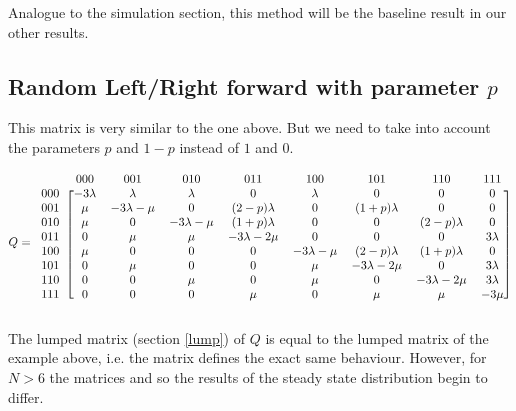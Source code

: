 \documentclass[10pt,a4paper]{article}
\begin{document}
Analogue to the simulation section, this method will be the baseline result in our other results.

\subsection{Random Left/Right forward with parameter $p$}
This matrix is very similar to the one above. But we need to take into account the parameters $p$ and $1-p$ instead of $1$ and $0$.

\[ Q =
  \begin{blockarray}{ccccccccc}
    & 000 & 001 & 010 & 011 & 100 & 101 & 110 & 111 \\
    \begin{block}{c[cccccccc]}
    000 & -3 \lambda & \lambda & \lambda & 0 & \lambda & 0 & 0 & 0 \\
    001 & \mu & -3\lambda-\mu & 0 & (2-p)\lambda & 0 & (1+p)\lambda & 0 & 0 \\
    010 & \mu & 0 & -3\lambda-\mu & (1+p)\lambda & 0 & 0 & (2-p)\lambda & 0 \\
    011 & 0 & \mu & \mu & -3\lambda-2\mu & 0 & 0 & 0 & 3\lambda \\
    100 & \mu & 0 & 0 & 0 & -3\lambda-\mu & (2-p)\lambda & (1+p)\lambda & 0 \\
    101 & 0 & \mu & 0 & 0 & \mu & -3\lambda-2\mu & 0 & 3\lambda \\
    110 & 0 & 0 & \mu & 0 & \mu & 0 & -3\lambda-2\mu & 3\lambda \\
    111 & 0 & 0 & 0 & \mu & 0 & \mu & \mu & -3\mu \\
    \end{block}
  \end{blockarray}
\]

The lumped matrix (section \ref{lump}) of $Q$ is equal to the lumped matrix of the example above, i.e. the matrix defines the exact same behaviour. However, for $N > 6$ the matrices and so the results of the steady state distribution begin to differ.
\end{document}
